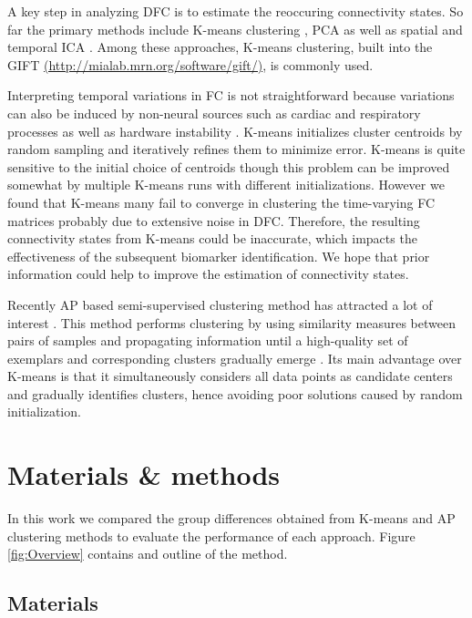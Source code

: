 \documentclass{article}
\begin{document}
A key step in analyzing \ac{DFC} is to estimate the reoccuring connectivity states. So far the primary methods include K-means clustering \cite{allen_tracking_2014}, \ac{PCA} \cite{leonardi_disentangling_2014} as well as spatial and temporal \ac{ICA} \cite{du_group_2015} \cite{miller_higher_2016}. Among these approaches, K-means clustering, built into the \ac{GIFT} \href{http://mialab.mrn.org/software/gift/}{(http://mialab.mrn.org/software/gift/)}, is commonly used.

Interpreting temporal variations in \ac{FC} is not straightforward because variations can also be induced by non-neural sources such as cardiac and respiratory processes as well as hardware instability \cite{hutchison_dynamic_2013}. K-means initializes cluster centroids by random sampling and iteratively refines them to minimize error. K-means is quite sensitive to the initial choice of centroids though this problem can be improved somewhat by multiple K-means runs with different initializations. However we found that K-means many fail to converge in clustering the time-varying \ac{FC} matrices probably due to extensive noise in \ac{DFC}. Therefore, the resulting connectivity states from K-means could be inaccurate, which impacts the effectiveness of the subsequent biomarker identification. We hope that prior information could help to improve the estimation of connectivity states.

Recently \acl{AP}  based semi-supervised clustering method has attracted a lot of interest \cite{shine_temporal_2016}. This method performs clustering by using similarity measures between pairs of samples and propagating information until a high-quality set of exemplars and corresponding clusters gradually emerge \cite{frey_clustering_2007}. Its main advantage over K-means is that it simultaneously considers all data points as candidate centers and gradually identifies clusters, hence avoiding poor solutions caused by random initialization.

\section{Materials \& methods}
\label{sec:MaterialsM}

In this work we compared the group differences obtained from K-means and \ac{AP} clustering methods to evaluate the performance of each approach. Figure \ref{fig:Overview} contains and outline of the method.

\subsection{Materials}
\label{sec:Materials}
\end{document}
